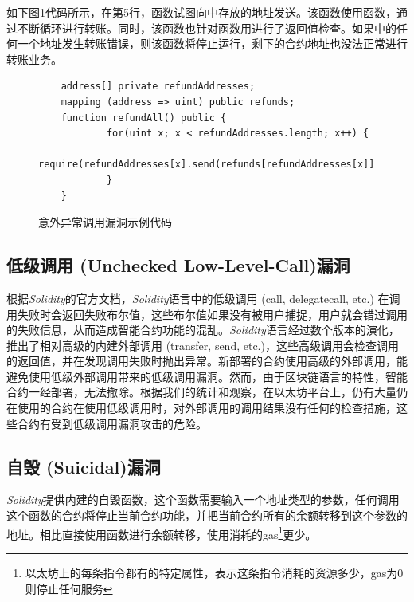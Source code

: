 如下图\ref{fig:revert_vul}代码所示，在第5行，函数试图向中存放的地址发送。该函数使用函数，通过不断循环进行转账。同时，该函数也针对函数用进行了返回值检查。如果中的任何一个地址发生转账错误，则该函数将停止运行，剩下的合约地址也没法正常进行转账业务。

\begin{figure}
\begin{minipage}[htb]{1.0\linewidth}
    \begin{lstlisting}
    address[] private refundAddresses;
    mapping (address => uint) public refunds;
    function refundAll() public {
            for(uint x; x < refundAddresses.length; x++) {
                require(refundAddresses[x].send(refunds[refundAddresses[x]]));
            }
    }
    \end{lstlisting}
\end{minipage}
\vspace{-5mm}
\caption{意外异常调用漏洞示例代码}
\label{fig:revert_vul}
\end{figure}


\subsection{低级调用 (Unchecked Low-Level-Call)漏洞}

根据\emph{Solidity}的官方文档\cite{solidity-doc}，\emph{Solidity}语言中的低级调用 (call, delegatecall, etc.) 在调用失败时会返回失败布尔值，这些布尔值如果没有被用户捕捉，用户就会错过调用的失败信息，从而造成智能合约功能的混乱。\emph{Solidity}语言经过数个版本的演化，推出了相对高级的内建外部调用 (transfer, send, etc.)，这些高级调用会检查调用的返回值，并在发现调用失败时抛出异常。新部署的合约使用高级的外部调用，能避免使用低级外部调用带来的低级调用漏洞。然而，由于区块链语言的特性，智能合约一经部署，无法撤除。根据我们的统计和观察，在以太坊平台上，仍有大量仍在使用的合约在使用低级调用时，对外部调用的调用结果没有任何的检查措施，这些合约有受到低级调用漏洞攻击的危险。

\subsection{自毁 (Suicidal)漏洞}

\emph{Solidity}提供内建的自毁函数，这个函数需要输入一个地址类型的参数，任何调用这个函数的合约将停止当前合约功能，并把当前合约所有的余额转移到这个参数的地址。相比直接使用函数进行余额转移，使用消耗的gas\footnote{以太坊上的每条指令都有的特定属性，表示这条指令消耗的资源多少，gas为0则停止任何服务}更少。

